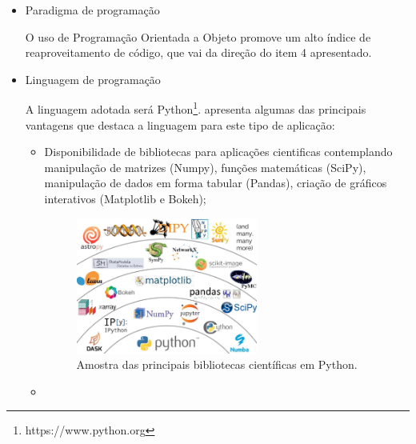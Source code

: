 
\begin{itemize}

\item Paradigma de programação

O uso de Programação Orientada a Objeto promove um alto índice de reaproveitamento de código, que vai da direção do item 4 apresentado.

\item Linguagem de programação

A linguagem adotada será Python\footnote{https://www.python.org}.  apresenta algumas das principais vantagens que destaca a linguagem para este tipo de aplicação:

\begin{itemize}
    \item Disponibilidade de bibliotecas para aplicações cientificas contemplando manipulação de matrizes (Numpy), funções matemáticas (SciPy), manipulação de dados em forma tabular (Pandas), criação de gráficos interativos (Matplotlib e Bokeh);
    
    \begin{figure}[!ht]
        \centering
        \includegraphics[width=0.6\textwidth]{imagens/python_ecosystem}
        \caption[Amostra das principais bibliotecas científicas em Python]{Amostra das principais bibliotecas científicas em Python.}\label{fig:python_ecosystem}
    \end{figure}

    \item 
\end{itemize}
\end{itemize}
